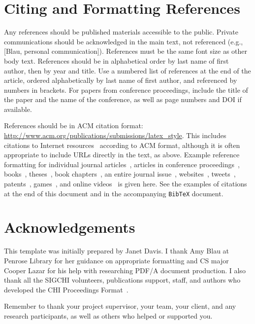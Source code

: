 \documentclass{article}
\begin{document}
\section{Citing and Formatting References}

Any references should be published materials accessible to the
public. Private communications
should be acknowledged in the main text, not referenced (e.g.,
[Blau, personal communication]). References must be the same
font size as other body text. References should be in alphabetical
order by last name of first author, then by year and title. Use a numbered list of references
at the end of the article, ordered alphabetically by last name of
first author, and referenced by numbers in brackets. For papers from
conference proceedings, include the title of the paper and the name of
the conference, as well as page numbers and DOI if available.

References should be in ACM citation format:
\url{http://www.acm.org/publications/submissions/latex_style}.  This
includes citations to Internet
resources~\cite{cavender:writing,CHI,CHINOSAUR:venue,OED:they,psy:gangnam}
according to ACM format, although it is often appropriate to include
URLs directly in the text, as above. Example reference formatting for
individual journal articles~\cite{ethics}, articles in conference
proceedings~\cite{Klemmer:2002:WSC:503376.503378},
books~\cite{Schwartz:1995:GBF}, theses~\cite{sutherland:sketchpad},
book chapters~\cite{winner:politics}, an entire journal
issue~\cite{kaye:puc},
websites~\cite{acm_categories,cavender:writing},
tweets~\cite{CHINOSAUR:venue}, patents~\cite{heilig:sensorama}, 
games~\cite{supermetroid:snes}, and
online videos~\cite{psy:gangnam} is given here.  See the examples of
citations at the end of this document and in the accompanying
\texttt{BibTeX} document.

\section{Acknowledgements}
This template was initially prepared by Janet Davis.
I thank Amy Blau at Penrose Library for her guidance on appropriate formatting and  CS major Cooper Lazar for his help with researching PDF/A document production. I also thank all the SIGCHI volunteers, publications support, staff, and authors
who developed the CHI Proceedings Format~\cite{CHI}. 

Remember to thank your project supervisor, your team, your client, and any research participants, as well as others who helped or supported you.

\printbibliography
\end{document}
